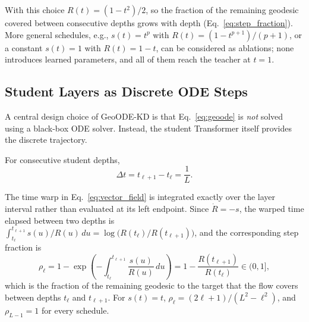 \documentclass[11pt]{article}
\begin{document}
With this choice $R(t)=(1-t^2)/2$, so the fraction of the remaining
geodesic covered between consecutive depths grows with depth (Eq.~\eqref{eq:step_fraction}).
More general schedules,
e.g.,
$s(t)=t^p$ with $R(t)=(1-t^{p+1})/(p+1)$, or a constant $s(t)=1$ with
$R(t)=1-t$, can be considered as ablations; none introduces learned
parameters, and all of them reach the teacher at $t=1$.


\subsection{Student Layers as Discrete ODE Steps}\label{sec:discrete}

A central design choice of GeoODE-KD is that
Eq.~\eqref{eq:geoode} is \emph{not} solved using a black-box ODE solver.
Instead, the student Transformer itself provides the discrete trajectory.

For consecutive student depths,
\begin{equation}
    \Delta t
    =
    t_{\ell+1}-t_\ell
    =
    \frac{1}{L}.
\end{equation}

The time warp in Eq.~\eqref{eq:vector_field} is integrated exactly over
the layer interval rather than evaluated at its left endpoint. Since
$\dot R=-s$, the warped time elapsed between two depths is
$\int_{t_\ell}^{t_{\ell+1}} s(u)/R(u)\,du=\log\bigl(R(t_\ell)/R(t_{\ell+1})\bigr)$,
and the corresponding step fraction is
\begin{equation}
    \rho_\ell
    =
    1-\exp\left(-\int_{t_\ell}^{t_{\ell+1}}\frac{s(u)}{R(u)}\,du\right)
    =
    1-\frac{R(t_{\ell+1})}{R(t_\ell)}
    \in(0,1],
    \label{eq:step_fraction}
\end{equation}
which is the fraction of the remaining geodesic to the target that the flow
covers between depths $t_\ell$ and $t_{\ell+1}$. For $s(t)=t$,
$\rho_\ell=(2\ell+1)/(L^2-\ell^2)$, and $\rho_{L-1}=1$ for every
schedule.
\end{document}
